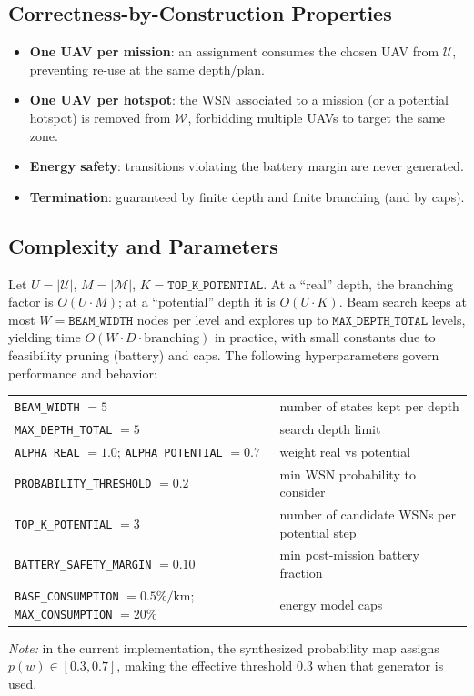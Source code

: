 \subsection*{Correctness-by-Construction Properties}
\begin{itemize}
  \item \textbf{One UAV per mission}: an assignment consumes the chosen UAV from
        \(\mathcal{U}\), preventing re-use at the same depth/plan.
  \item \textbf{One UAV per hotspot}: the WSN associated to a mission (or a potential hotspot)
        is removed from \(\mathcal{W}\), forbidding multiple UAVs to target the same zone.
  \item \textbf{Energy safety}: transitions violating the battery margin are never generated.
  \item \textbf{Termination}: guaranteed by finite depth and finite branching (and by caps).
\end{itemize}

\subsection*{Complexity and Parameters}
Let \(U=|\mathcal{U}|\), \(M=|\mathcal{M}|\), \(K=\texttt{TOP\_K\_POTENTIAL}\).
At a ``real'' depth, the branching factor is \(O(U\cdot M)\); at a ``potential'' depth it is \(O(U\cdot K)\).
Beam search keeps at most \(W=\texttt{BEAM\_WIDTH}\) nodes per level and explores up to
\(\texttt{MAX\_DEPTH\_TOTAL}\) levels, yielding time \(O\!\left(W \cdot D \cdot \text{branching}\right)\)
in practice, with small constants due to feasibility pruning (battery) and caps.
The following hyperparameters govern performance and behavior:
\begin{center}
\begin{tabular}{ll}
\texttt{BEAM\_WIDTH} $=5$ & number of states kept per depth \\
\texttt{MAX\_DEPTH\_TOTAL} $=5$ & search depth limit \\
\texttt{ALPHA\_REAL} $=1.0$; \texttt{ALPHA\_POTENTIAL} $=0.7$ & weight real vs potential \\
\texttt{PROBABILITY\_THRESHOLD} $=0.2$ & min WSN probability to consider \\
\texttt{TOP\_K\_POTENTIAL} $=3$ & number of candidate WSNs per potential step \\
\texttt{BATTERY\_SAFETY\_MARGIN} $=0.10$ & min post-mission battery fraction \\
\texttt{BASE\_CONSUMPTION} $=0.5\%/\text{km}$; \texttt{MAX\_CONSUMPTION} $=20\%$ & energy model caps \\
\end{tabular}
\end{center}
\emph{Note:} in the current implementation, the synthesized probability map assigns
\(p(w)\in[0.3, 0.7]\), making the effective threshold \(0.3\) when that generator is used.

